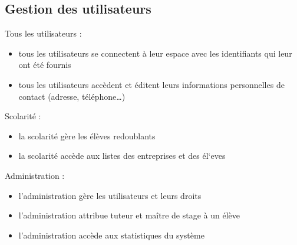 \documentclass{scrreprt}
\begin{document}
\subsection{Gestion des utilisateurs}
Tous les utilisateurs :
\begin{itemize}
\item tous les utilisateurs se connectent \`a leur espace avec les identifiants qui leur ont \'et\'e fournis
\item tous les utilisateurs acc\`edent et \'editent leurs informations personnelles de contact (adresse, t\'el\'ephone…)
\end{itemize}
Scolarit\'e :
\begin{itemize}
\item la scolarit\'e g\`ere les \'el\`eves redoublants
\item la scolarit\'e acc\`ede aux listes des entreprises et des \'el`eves
\end{itemize}
Administration : 
\begin{itemize}
\item l’administration g\`ere les utilisateurs et leurs droits
\item l’administration attribue tuteur et ma\^itre de stage \`a un \'el\`eve
\item l’administration acc\`ede aux statistiques du syst\`eme
\end{itemize}

\newpage
\end{document}
